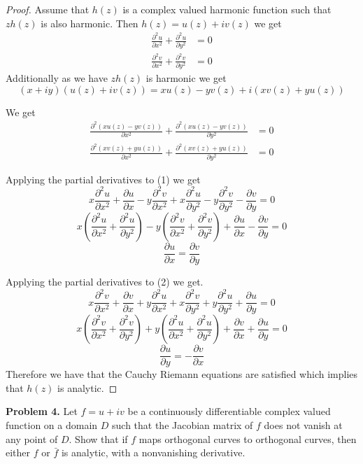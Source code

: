 \documentclass[letter,12pt,reqno]{article}
\begin{document}
    \begin{proof}
        Assume that $h(z)$ is a complex valued harmonic function such that $zh(z)$ is also harmonic. Then $h(z)=u(z)+iv(z)$ we get \begin{align*}
            \frac{\partial^2 u}{\partial x^2}+\frac{\partial^2 u}{\partial y^2 } & =0 \\ \frac{\partial^2 v}{\partial x^2}+\frac{\partial ^2 v}{\partial y^2} & =0
        \end{align*} 
        Additionally as we have $zh(z)$ is harmonic we get $$(x+iy)(u(z)+iv(z))=xu(z)-yv(z) +i(xv(z)+yu(z))$$
         
        We get \begin{align}
            \frac{\partial ^2(xu(z)-yv(z))}{\partial x^2}+\frac{\partial ^2 (xu(z)-yv(z))}{\partial y^2} &=0 \\ \frac{\partial ^2(xv(z)+yu(z))}{\partial x^2}+\frac{\partial ^2 (xv(z)+yu(z))}{\partial y^2} &=0
        \end{align}

        Applying the partial derivatives to (1) we get 
        \[
            x\frac{\partial ^2 u}{\partial x^2}+ \frac{\partial u}{\partial x}-y\frac{\partial^2 v}{\partial x^2}+ x\frac{\partial ^2 u}{\partial y^2}- y\frac{\partial ^2 v}{\partial y^2}- \frac{\partial v}{\partial y}=0
        \]
        \[
            x(\frac{\partial^2 u}{\partial x^2}+\frac{\partial ^2 u}{\partial y^2})-y(\frac{\partial ^2 v}{\partial x^2}+\frac{\partial ^2 v}{\partial y^2})+ \frac{\partial u}{\partial x}-\frac{\partial v}{\partial y}=0
        \]
        \[
            \frac{\partial u}{\partial x}=\frac{\partial v}{\partial y}
        \]
        
        Applying the partial derivatives to (2) we get.
        \[
            x\frac{\partial ^2 v}{\partial x^2}+ \frac{\partial v}{\partial x}+ y\frac{\partial ^2 u}{\partial x^2 } + x\frac{\partial ^2 v}{\partial y^2}+y\frac{\partial ^2u}{\partial y^2}+ \frac{\partial u}{\partial y}=0
        \] 
        \[
            x(\frac{\partial ^2 v}{\partial x^2}+\frac{\partial ^2 v}{\partial y^2})+y(\frac{\partial ^2 u}{\partial x^2}+\frac{\partial^2 u}{\partial y^2})+\frac{\partial v}{\partial x}+\frac{\partial u}{\partial y}=0
        \]
        \[
            \frac{\partial u}{\partial y}=-\frac{\partial v}{\partial x}
        \]
        Therefore we have that the Cauchy Riemann equations are satisfied which implies that $h(z)$ is analytic.
    \end{proof}
    \begin{tcolorbox}
    \textbf{Problem 4.}
    Let $f=u+iv$ be a continuously differentiable complex valued function on a domain $D$ such that the Jacobian matrix of $f$ does not vanish at any point of $D$. Show that if $f$ maps orthogonal curves to orthogonal curves, then either $f$ or $\bar f$ is analytic, with a nonvanishing derivative.
    \end{tcolorbox}
\end{document}
